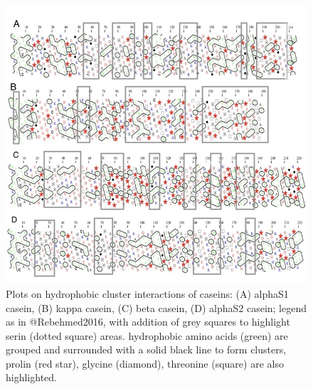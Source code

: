 \documentclass[
]{article}
\begin{document}
\begin{figure}
\includegraphics[width=1\linewidth]{images/HCA_serin} \caption{Plots on hydrophobic cluster interactions of caseins:  (A) alphaS1 casein, (B) kappa casein, (C) beta casein, (D) alphaS2 casein; legend as in @Rebehmed2016, with addition of grey squares to highlight serin (dotted square) areas.  hydrophobic amino acids (green) are grouped and surrounded with a solid black line to form clusters, prolin (red star), glycine (diamond), threonine (square) are also highlighted.}\label{fig:unnamed-chunk-7}
\end{figure}
\end{document}
